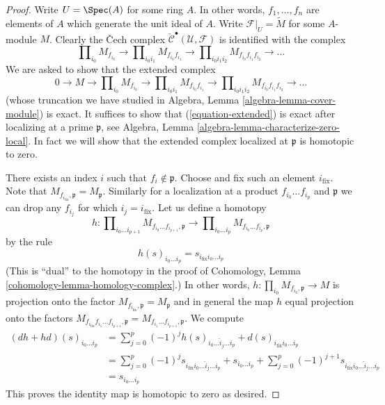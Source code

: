 \begin{proof}
Write $U = \Spec(A)$ for some ring $A$.
In other words, $f_1, \ldots, f_n$ are elements of $A$
which generate the unit ideal of $A$.
Write $\mathcal{F}|_U = \widetilde{M}$ for some $A$-module $M$.
Clearly the {\v C}ech complex
$\check{\mathcal{C}}^\bullet(\mathcal{U}, \mathcal{F})$
is identified with the complex
$$
\prod\nolimits_{i_0} M_{f_{i_0}} \to
\prod\nolimits_{i_0i_1} M_{f_{i_0}f_{i_1}} \to
\prod\nolimits_{i_0i_1i_2} M_{f_{i_0}f_{i_1}f_{i_2}} \to
\ldots
$$
We are asked to show that the extended complex
\begin{equation}
\label{equation-extended}
0 \to
M \to
\prod\nolimits_{i_0} M_{f_{i_0}} \to
\prod\nolimits_{i_0i_1} M_{f_{i_0}f_{i_1}} \to
\prod\nolimits_{i_0i_1i_2} M_{f_{i_0}f_{i_1}f_{i_2}} \to
\ldots
\end{equation}
(whose truncation we have studied in
Algebra, Lemma \ref{algebra-lemma-cover-module}) is exact.
It suffices to show that (\ref{equation-extended})
is exact after localizing at a prime $\mathfrak p$, see
Algebra, Lemma \ref{algebra-lemma-characterize-zero-local}.
In fact we will show that the extended complex localized
at $\mathfrak p$ is homotopic to zero.

\medskip\noindent
There exists an index $i$ such that $f_i \not \in \mathfrak p$.
Choose and fix such an element $i_{\text{fix}}$. Note that
$M_{f_{i_{\text{fix}}}, \mathfrak p} = M_{\mathfrak p}$. Similarly
for a localization at a product $f_{i_0} \ldots f_{i_p}$ and $\mathfrak p$
we can drop any $f_{i_j}$ for which $i_j = i_{\text{fix}}$.
Let us define a homotopy
$$
h :
\prod\nolimits_{i_0 \ldots i_{p + 1}}
M_{f_{i_0} \ldots f_{i_{p + 1}}, \mathfrak p}
\longrightarrow
\prod\nolimits_{i_0 \ldots i_p}
M_{f_{i_0} \ldots f_{i_p}, \mathfrak p}
$$
by the rule
$$
h(s)_{i_0 \ldots i_p} = s_{i_{\text{fix}} i_0 \ldots i_p}
$$
(This is ``dual'' to the homotopy in the proof of
Cohomology, Lemma \ref{cohomology-lemma-homology-complex}.)
In other words, $h : \prod_{i_0} M_{f_{i_0}, \mathfrak p} \to M$
is projection onto the factor
$M_{f_{i_{\text{fix}}}, \mathfrak p} = M_{\mathfrak p}$ and in general
the map $h$ equal projection onto the factors
$M_{f_{i_{\text{fix}}} f_{i_1} \ldots f_{i_{p + 1}}, \mathfrak p}
= M_{f_{i_1} \ldots f_{i_{p + 1}}, \mathfrak p}$. We compute
\begin{align*}
(dh + hd)(s)_{i_0 \ldots i_p}
& =
\sum\nolimits_{j = 0}^p
(-1)^j
h(s)_{i_0 \ldots \hat i_j \ldots i_p}
+
d(s)_{i_{\text{fix}} i_0 \ldots i_p}\\
& =
\sum\nolimits_{j = 0}^p
(-1)^j
s_{i_{\text{fix}} i_0 \ldots \hat i_j \ldots i_p}
+
s_{i_0 \ldots i_p}
+
\sum\nolimits_{j = 0}^p
(-1)^{j + 1}
s_{i_{\text{fix}} i_0 \ldots \hat i_j \ldots i_p} \\
& =
s_{i_0 \ldots i_p}
\end{align*}
This proves the identity map is homotopic to zero as desired.
\end{proof}

